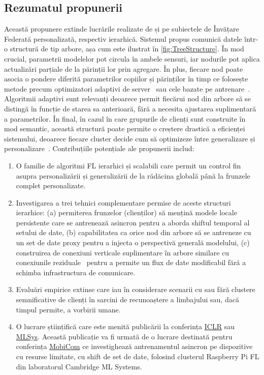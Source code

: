 \subsection{Rezumatul propunerii}

Această propunere extinde lucrările realizate de \citet{EuroMLSysWorkshop} și \citet{OperaWorkshop} pe subiectele de Învățare Federată personalizată, respectiv ierarhică. Sistemul propus comunică datele într-o structură de tip arbore, așa cum este ilustrat în \cref{fig:TreeStructure}. În mod crucial, parametrii modelelor pot circula în ambele sensuri, iar nodurile pot aplica actualizări parțiale de la părinții lor prin agregare. În plus, fiecare nod poate asocia o pondere diferită parametrilor copiilor și părinților în timp ce folosește metode precum optimizatori adaptivi de server~\citep{FedOPT} sau cele bazate pe antrenare~\citep{Ditto,EWC,DeepMutualLearning}. Algoritmii adaptivi sunt relevanți deoarece permit fiecărui nod din arbore să se distingă în funcție de starea sa anterioară, fără a necesita ajustarea suplimentară a parametrilor. În final, în cazul în care grupurile de clienți sunt construite în mod semantic, această structură poate permite o creștere drastică a eficienței sistemului, deoarece fiecare cluster decide cum să optimizeze între generalizare și personalizare~\citep{PersonalisationGeneralisationTradeoff}. Contribuțiile potențiale ale propunerii includ:
\begin{enumerate}
    \item O familie de algoritmi FL ierarhici și scalabili care permit un control fin asupra personalizării și generalizării de la rădăcina globală până la frunzele complet personalizate.
    \item Investigarea a trei tehnici complementare permise de aceste structuri ierarhice: (a) permiterea frunzelor (clienților) să mențină modele locale persistente care se antrenează asincron pentru a aborda shiftul temporal al setului de date, (b) capabilitatea ca orice nod din arbore să se antreneze cu un set de date proxy pentru a injecta o perspectivă generală modelului, (c) construirea de conexiuni verticale suplimentare în arbore similare cu conexiunile reziduale~\citep{ResNet} pentru a permite un flux de date modificabil fără a schimba infrastructura de comunicare.
    \item Evaluări empirice extinse care iau în considerare scenarii cu sau fără clustere semnificative de clienți în sarcini de recunoaștere a limbajului sau, dacă timpul permite, a vorbirii umane.
    \item O lucrare științifică care este menită publicării la conferința \href{https://iclr.cc/}{ICLR} sau \href{https://mlsys.org/}{MLSys}. Această publicație va fi urmată de o lucrare destinată pentru conferința \href{https://sigmobile.org/mobicom/2023/}{MobiCom} ce investighează antrenamentul asincron pe dispozitive cu resurse limitate, cu shift de set de date, folosind clusterul Raspberry Pi FL din laboratorul Cambridge ML Systems.
\end{enumerate}
